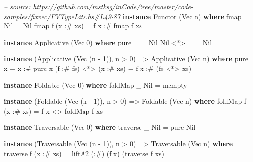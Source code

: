 \documentclass[]{article}
\newenvironment{Shaded}{}{}
\newcommand{\KeywordTok}[1]{\textcolor[rgb]{0.00,0.44,0.13}{\textbf{{#1}}}}
\newcommand{\DataTypeTok}[1]{\textcolor[rgb]{0.56,0.13,0.00}{{#1}}}
\newcommand{\DecValTok}[1]{\textcolor[rgb]{0.25,0.63,0.44}{{#1}}}
\newcommand{\CommentTok}[1]{\textcolor[rgb]{0.38,0.63,0.69}{\textit{{#1}}}}
\newcommand{\OtherTok}[1]{\textcolor[rgb]{0.00,0.44,0.13}{{#1}}}
\newcommand{\FunctionTok}[1]{\textcolor[rgb]{0.02,0.16,0.49}{{#1}}}
\newcommand{\NormalTok}[1]{{#1}}
\begin{document}
\begin{Shaded}
\begin{Highlighting}[]
\CommentTok{-- source: https://github.com/mstksg/inCode/tree/master/code-samples/fixvec/FVTypeLits.hs#L49-87}
\KeywordTok{instance} \DataTypeTok{Functor} \NormalTok{(}\DataTypeTok{Vec} \NormalTok{n) }\KeywordTok{where}
    \NormalTok{fmap _ }\DataTypeTok{Nil}       \FunctionTok{=} \DataTypeTok{Nil}
    \NormalTok{fmap f (x }\FunctionTok{:#} \NormalTok{xs) }\FunctionTok{=} \NormalTok{f x }\FunctionTok{:#} \NormalTok{fmap f xs}

\KeywordTok{instance} \DataTypeTok{Applicative} \NormalTok{(}\DataTypeTok{Vec} \DecValTok{0}\NormalTok{) }\KeywordTok{where}
    \NormalTok{pure _    }\FunctionTok{=} \DataTypeTok{Nil}
    \DataTypeTok{Nil} \FunctionTok{<*>} \NormalTok{_ }\FunctionTok{=} \DataTypeTok{Nil}

\KeywordTok{instance} \NormalTok{(}\DataTypeTok{Applicative} \NormalTok{(}\DataTypeTok{Vec} \NormalTok{(n }\FunctionTok{-} \DecValTok{1}\NormalTok{)), n }\FunctionTok{>} \DecValTok{0}\NormalTok{) }\OtherTok{=>} \DataTypeTok{Applicative} \NormalTok{(}\DataTypeTok{Vec} \NormalTok{n) }\KeywordTok{where}
    \NormalTok{pure x }\FunctionTok{=} \NormalTok{x }\FunctionTok{:#} \NormalTok{pure x}
    \NormalTok{(f }\FunctionTok{:#} \NormalTok{fs) }\FunctionTok{<*>} \NormalTok{(x }\FunctionTok{:#} \NormalTok{xs) }\FunctionTok{=} \NormalTok{f x }\FunctionTok{:#} \NormalTok{(fs }\FunctionTok{<*>} \NormalTok{xs)}

\KeywordTok{instance} \DataTypeTok{Foldable} \NormalTok{(}\DataTypeTok{Vec} \DecValTok{0}\NormalTok{) }\KeywordTok{where}
    \NormalTok{foldMap _ }\DataTypeTok{Nil} \FunctionTok{=} \NormalTok{mempty}

\KeywordTok{instance} \NormalTok{(}\DataTypeTok{Foldable} \NormalTok{(}\DataTypeTok{Vec} \NormalTok{(n }\FunctionTok{-} \DecValTok{1}\NormalTok{)), n }\FunctionTok{>} \DecValTok{0}\NormalTok{) }\OtherTok{=>} \DataTypeTok{Foldable} \NormalTok{(}\DataTypeTok{Vec} \NormalTok{n) }\KeywordTok{where}
    \NormalTok{foldMap f (x }\FunctionTok{:#} \NormalTok{xs) }\FunctionTok{=} \NormalTok{f x }\FunctionTok{<>} \NormalTok{foldMap f xs}

\KeywordTok{instance} \DataTypeTok{Traversable} \NormalTok{(}\DataTypeTok{Vec} \DecValTok{0}\NormalTok{) }\KeywordTok{where}
    \NormalTok{traverse _ }\DataTypeTok{Nil} \FunctionTok{=} \NormalTok{pure }\DataTypeTok{Nil}

\KeywordTok{instance} \NormalTok{(}\DataTypeTok{Traversable} \NormalTok{(}\DataTypeTok{Vec} \NormalTok{(n }\FunctionTok{-} \DecValTok{1}\NormalTok{)), n }\FunctionTok{>} \DecValTok{0}\NormalTok{) }\OtherTok{=>} \DataTypeTok{Traversable} \NormalTok{(}\DataTypeTok{Vec} \NormalTok{n) }\KeywordTok{where}
    \NormalTok{traverse f (x }\FunctionTok{:#} \NormalTok{xs) }\FunctionTok{=} \NormalTok{liftA2 (}\FunctionTok{:#}\NormalTok{) (f x) (traverse f xs)}


\end{Highlighting}
\end{Shaded}
\end{document}
